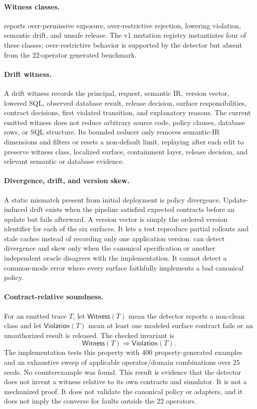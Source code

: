 \paragraph{Witness classes.}
\policystrata{} reports over-permissive exposure, over-restrictive rejection, lowering violation, semantic drift, and unsafe release. The v1 mutation registry instantiates four of these classes; over-restrictive behavior is supported by the detector but absent from the 22-operator generated benchmark.

\paragraph{Drift witness.}
A drift witness records the principal, request, semantic IR, version vector, lowered SQL, observed database result, release decision, surface responsibilities, contract decisions, first violated transition, and explanatory reasons. The current emitted witness does not reduce arbitrary source code, policy clauses, database rows, or SQL structure. Its bounded reducer only removes semantic-IR dimensions and filters or resets a non-default limit, replaying after each edit to preserve witness class, localized surface, containment layer, release decision, and relevant semantic or database evidence.

\paragraph{Divergence, drift, and version skew.}
A static mismatch present from initial deployment is policy divergence. Update-induced drift exists when the pipeline satisfied expected contracts before an update but fails afterward. A version vector is simply the ordered version identifier for each of the six surfaces. It lets a test reproduce partial rollouts and stale caches instead of recording only one application version. \policystrata{} can detect divergence and skew only when the canonical specification or another independent oracle disagrees with the implementation. It cannot detect a common-mode error where every surface faithfully implements a bad canonical policy.

\paragraph{Contract-relative soundness.}
For an emitted trace $T$, let $\mathsf{Witness}(T)$ mean the detector reports a non-clean class and let $\mathsf{Violation}(T)$ mean at least one modeled surface contract fails or an unauthorized result is released. The checked invariant is
\[
\mathsf{Witness}(T)\Rightarrow\mathsf{Violation}(T).
\]
The implementation tests this property with 400 property-generated examples and an exhaustive sweep of applicable operator/domain combinations over 25 seeds. No counterexample was found. This result is evidence that the detector does not invent a witness relative to its own contracts and simulator. It is not a mechanized proof. It does not validate the canonical policy or adapters, and it does not imply the converse for faults outside the 22 operators.

